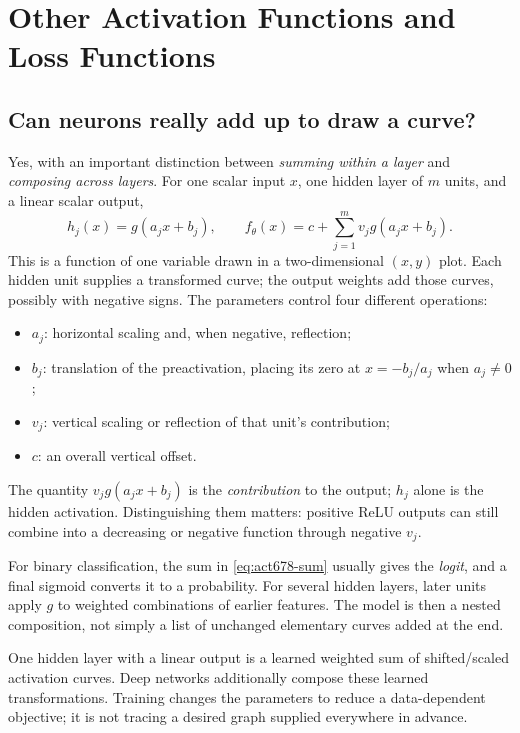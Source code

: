 \section{Other Activation Functions and Loss Functions}
\label{sec:logreg_to_mlp:other_activation_functions_and_loss_functions}

\subsection{Can neurons really add up to draw a curve?}
Yes, with an important distinction between \emph{summing within a layer} and \emph{composing across layers}. For one scalar input $x$, one hidden layer of $m$ units, and a linear scalar output,
\begin{equation}
 h_j(x)=g(a_jx+b_j),\qquad
 \boxed{f_\theta(x)=c+\sum_{j=1}^m v_jg(a_jx+b_j).}
 \label{eq:act678-sum}
\end{equation}
This is a function of one variable drawn in a two-dimensional $(x,y)$ plot. Each hidden unit supplies a transformed curve; the output weights add those curves, possibly with negative signs. The parameters control four different operations:
\begin{itemize}
\item $a_j$: horizontal scaling and, when negative, reflection;
\item $b_j$: translation of the preactivation, placing its zero at $x=-b_j/a_j$ when $a_j\neq0$;
\item $v_j$: vertical scaling or reflection of that unit's contribution;
\item $c$: an overall vertical offset.
\end{itemize}
The quantity $v_jg(a_jx+b_j)$ is the \emph{contribution} to the output; $h_j$ alone is the hidden activation. Distinguishing them matters: positive ReLU outputs can still combine into a decreasing or negative function through negative $v_j$.

For binary classification, the sum in \eqref{eq:act678-sum} usually gives the \emph{logit}, and a final sigmoid converts it to a probability. For several hidden layers, later units apply $g$ to weighted combinations of earlier features. The model is then a nested composition, not simply a list of unchanged elementary curves added at the end.

\begin{keyidea}
One hidden layer with a linear output is a learned weighted sum of shifted/scaled activation curves. Deep networks additionally compose these learned transformations. Training changes the parameters to reduce a data-dependent objective; it is not tracing a desired graph supplied everywhere in advance.
\end{keyidea}

